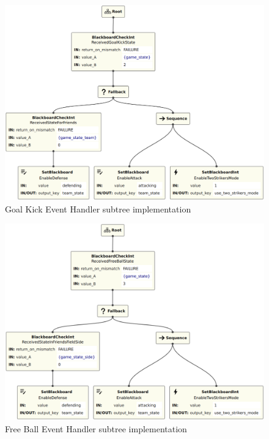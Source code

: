 \begin{figure}[!h]
    \centering
    \includegraphics[width=0.9\linewidth]{images/implementation/GoalKickEventHandler.png}
    \caption{Goal Kick Event Handler subtree implementation}
    \label{fig:goal_kick_event_handler_impl}
\end{figure}

\begin{figure}[!h]
    \centering
    \includegraphics[width=0.9\linewidth]{images/implementation/FreeBallEventHandler.png}
    \caption{Free Ball Event Handler subtree implementation}
    \label{fig:free_ball_event_handler_impl}
\end{figure}

